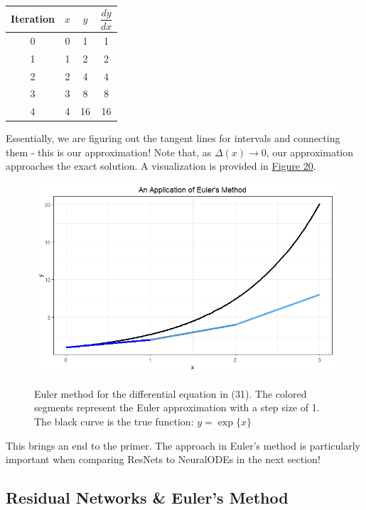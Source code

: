 \documentclass{article}
\begin{document}
\begin{center}
 \begin{tabular}{||c c c c||} 
 \hline
 Iteration & $x$ & $y$ & $\dfrac{dy}{dx}$ \\ [0.5ex] 
 \hline\hline
 0 & 0 & 1 & 1 \\ 
 \hline
 1 & 1 & 2 & 2 \\
 \hline
 2 & 2 & 4 & 4 \\
 \hline
 3 & 3 & 8 & 8 \\
 \hline
 4 & 4 & 16 & 16 \\ 
 \hline
\end{tabular}
\end{center}

\noindent Essentially, we are figuring out the tangent lines for intervals and connecting them - this is our approximation! Note that, as $\Delta(x) \rightarrow{0}$, our approximation approaches the exact solution. A visualization is provided in \hyperref[fig:euler]{Figure 20}.

\begin{figure}[h!]
  \centering
  \includegraphics[scale = 0.55]{euler2.png}
  \label{fig:euler}
  \caption{Euler method for the differential equation in (31). The colored segments represent the Euler approximation with a step size of 1. The black curve is the true function: $y = \exp\{x\}$}
\end{figure}

\noindent This brings an end to the primer. The approach in Euler's method is particularly important when comparing ResNets to NeuralODEs in the next section!


\subsection{Residual Networks \& Euler's Method}
\label{sec:resnnEuler}
\end{document}
